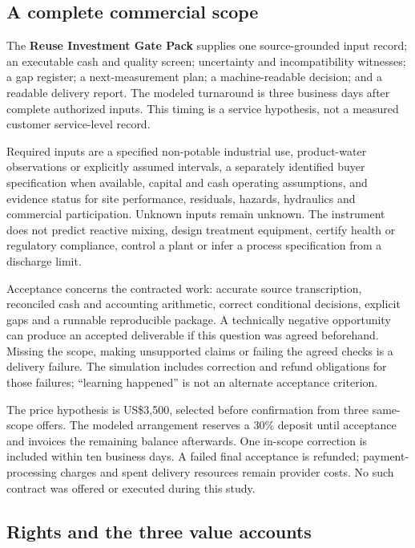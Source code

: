 \documentclass[
  11pt,
  letterpaper,
]{article}
\begin{document}
\hypertarget{a-complete-commercial-scope}{%
\subsection{A complete commercial
scope}\label{a-complete-commercial-scope}}

The \textbf{Reuse Investment Gate Pack} supplies one source-grounded
input record; an executable cash and quality screen; uncertainty and
incompatibility witnesses; a gap register; a next-measurement plan; a
machine-readable decision; and a readable delivery report. The modeled
turnaround is three business days after complete authorized inputs. This
timing is a service hypothesis, not a measured customer service-level
record.

Required inputs are a specified non-potable industrial use,
product-water observations or explicitly assumed intervals, a separately
identified buyer specification when available, capital and cash
operating assumptions, and evidence status for site performance,
residuals, hazards, hydraulics and commercial participation. Unknown
inputs remain unknown. The instrument does not predict reactive mixing,
design treatment equipment, certify health or regulatory compliance,
control a plant or infer a process specification from a discharge limit.

Acceptance concerns the contracted work: accurate source transcription,
reconciled cash and accounting arithmetic, correct conditional
decisions, explicit gaps and a runnable reproducible package. A
technically negative opportunity can produce an accepted deliverable if
this question was agreed beforehand. Missing the scope, making
unsupported claims or failing the agreed checks is a delivery failure.
The simulation includes correction and refund obligations for those
failures; ``learning happened'' is not an alternate acceptance
criterion.

The price hypothesis is US\$3,500, selected before confirmation from
three same-scope offers. The modeled arrangement reserves a 30\% deposit
until acceptance and invoices the remaining balance afterwards. One
in-scope correction is included within ten business days. A failed final
acceptance is refunded; payment-processing charges and spent delivery
resources remain provider costs. No such contract was offered or
executed during this study.

\hypertarget{rights-and-the-three-value-accounts}{%
\subsection{Rights and the three value
accounts}\label{rights-and-the-three-value-accounts}}
\end{document}
